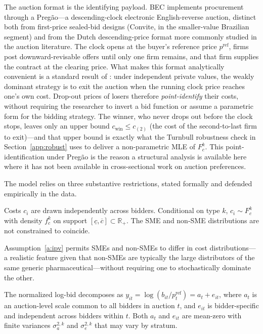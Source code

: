The auction format is the identifying payload. BEC implements procurement through a Preg\~ao---a descending-clock electronic English-reverse auction, distinct both from first-price sealed-bid designs (Convite, in the smaller-value Brazilian segment) and from the Dutch descending-price format more commonly studied in the auction literature. The clock opens at the buyer's reference price $p^{\mathrm{ref}}$, firms post downward-revisable offers until only one firm remains, and that firm supplies the contract at the clearing price. What makes this format analytically convenient is a standard result of \citet{haile2003}: under independent private values, the weakly dominant strategy is to exit the auction when the running clock price reaches one's own cost. Drop-out prices of losers therefore \emph{point-identify} their costs, without requiring the researcher to invert a bid function or assume a parametric form for the bidding strategy. The winner, who never drops out before the clock stops, leaves only an upper bound $c_{\text{win}} \le c_{(2)}$ (the cost of the second-to-last firm to exit)---and that upper bound is exactly what the Turnbull robustness check in Section~\ref{app:robust} uses to deliver a non-parametric MLE of $F_c^k$. This point-identification under Preg\~ao is the reason a structural analysis is available here where it has not been available in cross-sectional work on auction preferences.

The model relies on three substantive restrictions, stated formally and defended empirically in the data.

\begin{assumption}\label{a:ipv}
Costs $c_i$ are drawn independently across bidders. Conditional on type $k$, $c_i \sim F_c^k$ with density $f_c^k$ on support $[\underline{c}, \overline{c}] \subset \mathbb{R}_+$. The SME and non-SME distributions are not constrained to coincide.
\end{assumption}

Assumption~\ref{a:ipv} permits SMEs and non-SMEs to differ in cost distributions---a realistic feature given that non-SMEs are typically the large distributors of the same generic pharmaceutical---without requiring one to stochastically dominate the other.

\begin{assumption}\label{a:uh}
The normalized log-bid decomposes as $y_{it} = \log(b_{it} / p_t^{\mathrm{ref}}) = a_t + e_{it}$, where $a_t$ is an auction-level scale common to all bidders in auction $t$, and $e_{it}$ is bidder-specific and independent across bidders within $t$. Both $a_t$ and $e_{it}$ are mean-zero with finite variances $\sigma_a^{2,k}$ and $\sigma_e^{2,k}$ that may vary by stratum.
\end{assumption}

